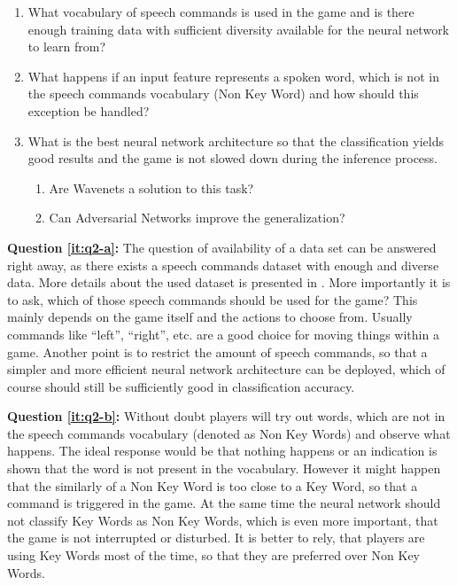 \begin{enumerate}[label={Q.2.\alph*)}, leftmargin=1.75cm]
    \item What vocabulary of speech commands is used in the game and is there enough training data with sufficient diversity available for the neural network to learn from?
    \label{it:q2-a}
    
    \item What happens if an input feature represents a spoken word, which is not in the speech commands vocabulary (Non Key Word) and how should this exception be handled?
    \label{it:q2-b}
    
    \item What is the best neural network architecture so that the classification yields good results and the game is not slowed down during the inference process.
    \label{it:q2-c}
    \begin{enumerate}[label=(\roman*)]
        \item Are Wavenets a solution to this task? 
        \item Can Adversarial Networks improve the generalization?
    \end{enumerate}
    
\end{enumerate}
\noindent
\textbf{Question \ref{it:q2-a}:} The question of availability of a data set can be answered right away, as there exists a speech commands dataset \cite{Warden2018} with enough and diverse data. 
More details about the used dataset is presented in . 
More importantly it is to ask, which of those speech commands should be used for the game? 
This mainly depends on the game itself and the actions to choose from. 
Usually commands like \enquote{left}, \enquote{right}, etc. are a good choice for moving things within a game.
Another point is to restrict the amount of speech commands, so that a simpler and more efficient neural network architecture can be deployed, which of course should still be sufficiently good in classification accuracy.

\textbf{Question \ref{it:q2-b}:} Without doubt players will try out words, which are not in the speech commands vocabulary (denoted as Non Key Words) and observe what happens.
The ideal response would be that nothing happens or an indication is shown that the word is not present in the vocabulary. 
However it might happen that the similarly of a Non Key Word is too close to a Key Word, so that a command is triggered in the game. 
At the same time the neural network should not classify Key Words as Non Key Words, which is even more important, that the game is not interrupted or disturbed.
It is better to rely, that players are using Key Words most of the time, so that they are preferred over Non Key Words.


